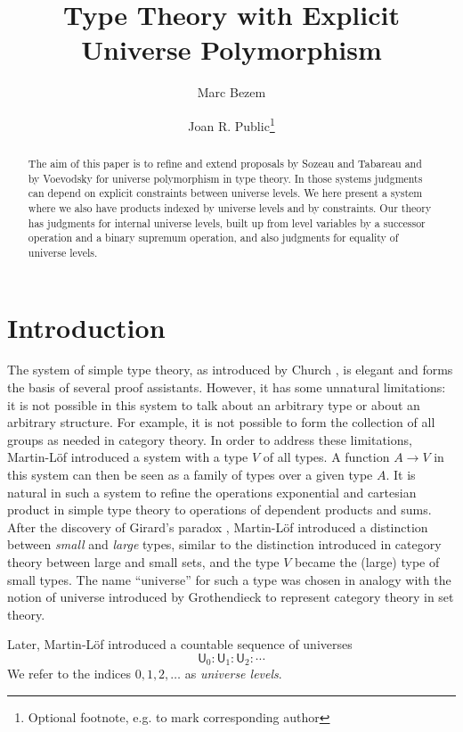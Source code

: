 \documentclass[a4paper,UKenglish,cleveref, autoref, thm-restate]{lipics-v2021}
\title{Type Theory with Explicit Universe Polymorphism} %
\author{Marc Bezem}{University of Bergen, Norway}{Marc.Bezem@uib.no}{https://orcid.org/0000-0002-7320-1976}{}
\author{Joan R. Public\footnote{Optional footnote, e.g. to mark corresponding author}}{Department of Informatics, Dummy College, [optional: Address], Country}{joanrpublic@dummycollege.org}{[orcid]}{[funding]}
\newcommand{\UU}{\mathsf{U}}
\begin{document}
\maketitle

\begin{abstract}
The aim of this paper is to refine and extend proposals by Sozeau and Tabareau and by Voevodsky for universe polymorphism in type theory. In those systems judgments can depend on explicit constraints between universe levels. We here present a system where we also have products indexed by universe levels and by constraints. Our theory has judgments for internal universe levels, built up from level variables by a successor operation and a binary supremum operation, and also judgments for equality of universe levels.
\end{abstract}

\section{Introduction}\label{sec:intro}

The system of simple type theory,
as introduced by Church \cite{church:formulation},
is elegant and forms the basis of several proof assistants.
However, it has some unnatural limitations:
it is not possible in this system to talk
about an arbitrary type or about an arbitrary structure.
For example, it is not possible to form the collection of all groups
as needed in category theory. In order to address these limitations,
Martin-L\"of \cite{ML71,ML71a} introduced a system with a type $V$ of all types.
A function $A\rightarrow V$ in this system can then be seen as a family of types
over a given type $A$. It is natural in such a system to refine
the operations exponential and cartesian product in simple type theory
to operations of dependent products and sums.
After the discovery of Girard's paradox \cite{Girard71},
Martin-L\"of \cite{ML72} introduced a distinction between
{\em small} and {\em large} types, similar to the distinction introduced
in category theory between large and small sets,
and the type $V$ became the (large) type of small types.
The name ``universe'' for such a type was chosen in analogy with the notion of
universe introduced by Grothendieck to represent category theory in set theory.

Later, Martin-L\"of \cite{martinlof:predicative} introduced a countable sequence of universes
$$
\UU_0 : \UU_1 : \UU_2 : \cdots
$$
We refer to the indices $0, 1, 2, \ldots$ as {\em universe levels}.
\end{document}
